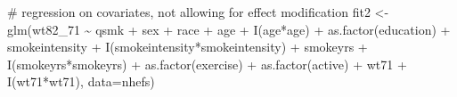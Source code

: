 \documentclass[
  10pt,
  a4paper,
]{book}
\newenvironment{Shaded}{\begin{snugshade}}{\end{snugshade}}
\newcommand{\AttributeTok}[1]{\textcolor[rgb]{0.40,0.45,0.13}{#1}}
\newcommand{\CommentTok}[1]{\textcolor[rgb]{0.37,0.37,0.37}{#1}}
\newcommand{\FunctionTok}[1]{\textcolor[rgb]{0.28,0.35,0.67}{#1}}
\newcommand{\NormalTok}[1]{\textcolor[rgb]{0.00,0.46,0.62}{#1}}
\newcommand{\OtherTok}[1]{\textcolor[rgb]{0.00,0.46,0.62}{#1}}
\newcommand{\SpecialCharTok}[1]{\textcolor[rgb]{0.37,0.37,0.37}{#1}}
\begin{document}
\begin{Shaded}
\begin{Highlighting}[]
\CommentTok{\# regression on covariates, not allowing for effect modification}
\NormalTok{fit2 }\OtherTok{\textless{}{-}} \FunctionTok{glm}\NormalTok{(wt82\_71 }\SpecialCharTok{\textasciitilde{}}\NormalTok{ qsmk }\SpecialCharTok{+}\NormalTok{ sex }\SpecialCharTok{+}\NormalTok{ race }\SpecialCharTok{+}\NormalTok{ age }\SpecialCharTok{+} \FunctionTok{I}\NormalTok{(age}\SpecialCharTok{*}\NormalTok{age) }\SpecialCharTok{+} \FunctionTok{as.factor}\NormalTok{(education)}
           \SpecialCharTok{+}\NormalTok{ smokeintensity }\SpecialCharTok{+} \FunctionTok{I}\NormalTok{(smokeintensity}\SpecialCharTok{*}\NormalTok{smokeintensity) }\SpecialCharTok{+}\NormalTok{ smokeyrs}
           \SpecialCharTok{+} \FunctionTok{I}\NormalTok{(smokeyrs}\SpecialCharTok{*}\NormalTok{smokeyrs) }\SpecialCharTok{+} \FunctionTok{as.factor}\NormalTok{(exercise) }\SpecialCharTok{+} \FunctionTok{as.factor}\NormalTok{(active)}
           \SpecialCharTok{+}\NormalTok{ wt71 }\SpecialCharTok{+} \FunctionTok{I}\NormalTok{(wt71}\SpecialCharTok{*}\NormalTok{wt71), }\AttributeTok{data=}\NormalTok{nhefs)}
  

\end{Highlighting}
\end{Shaded}
\end{document}
